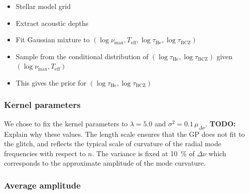 \documentclass[linenumbers,modern,astrosymb,times]{aastex631dm}
\newcommand{\helium}{\mathrm{He}}
\newcommand{\bcz}{\mathrm{BCZ}}
\newcommand{\todo}[1]{{\color{todo} \textbf{TODO:} #1}}
\begin{document}
\begin{itemize}
    \item Stellar model grid
    \item Extract acoustic depths
    \item Fit Gaussian mixture to \((\log\nu_\mathrm{max}, T_\mathrm{eff},
          \log\tau_\helium, \log\tau_\bcz)\)
    \item Sample from the conditional distribution of \((\log\tau_\helium,
          \log\tau_\bcz)\) given \((\log\nu_\mathrm{max}, T_\mathrm{eff})\)
    \item This gives the prior for \((\log\tau_\helium, \log\tau_\bcz)\)
\end{itemize}


\subsubsection{Kernel parameters}\label{sec:kernel-params}

We chose to fix the kernel parameters to \(\lambda = 5.0\) and \(\sigma^2 =
0.1 \, \mu_{\Delta\nu}\). \todo{Explain why these values.} The length scale ensures that the
GP does not fit to the glitch, and reflects the typical scale of curvature of
the radial mode frequencies with respect to \(n\). The variance is fixed at
\SI{10}{\percent} of \(\Delta\nu\) which corresponds to the approximate
amplitude of the mode curvature.


\subsubsection{Average amplitude}\label{sec:avg-amp}
\end{document}
